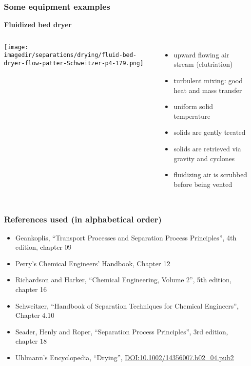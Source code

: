 \begin{frame}\frametitle{Some equipment examples}
	\textbf{Fluidized bed dryer}
	\begin{columns}[t]
			\begin{center}
				\texttt{[image: \\imagedir/separations/drying/fluid-bed-dryer-flow-patter-Schweitzer-p4-179.png]}
			\end{center}
			\vspace{-12pt}
			\begin{itemize}
				\item	upward flowing air stream (elutriation)
				\item	turbulent mixing: good heat and mass transfer
				\item	uniform solid temperature
				\item	solids are gently treated
				\item	solids are retrieved via gravity and cyclones
				\item	fluidizing air is scrubbed before being vented
			\end{itemize}
	\end{columns}
\end{frame}



\begin{frame}\frametitle{References used (in alphabetical order)}
	\begin{itemize}
		\item	Geankoplis, ``Transport Processes and Separation Process Principles'', 4th edition, chapter 09
		\item	Perry's Chemical Engineers' Handbook, Chapter 12
		\item	Richardson and Harker, ``Chemical Engineering, Volume 2'', 5th edition, chapter 16	
		\item	Schweitzer, ``Handbook of Separation Techniques for Chemical Engineers'', Chapter 4.10
		\item	Seader, Henly and Roper, ``Separation Process Principles'', 3rd edition, chapter 18
		\item	Uhlmann's Encyclopedia, ``Drying'', {\tiny \href{http://dx.doi.org/10.1002/14356007.b02\_04.pub2}{DOI:10.1002/14356007.b02\_04.pub2}}
	\end{itemize}
\end{frame}